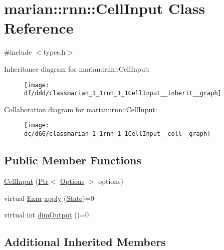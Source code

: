 \hypertarget{classmarian_1_1rnn_1_1CellInput}{}\section{marian\+:\+:rnn\+:\+:Cell\+Input Class Reference}
\label{classmarian_1_1rnn_1_1CellInput}


{\ttfamily \#include $<$types.\+h$>$}



Inheritance diagram for marian\+:\+:rnn\+:\+:Cell\+Input\+:
\nopagebreak
\begin{figure}[H]
\begin{center}
\leavevmode
\texttt{[image: df/ddd/classmarian\_1\_1rnn\_1\_1CellInput\_\_inherit\_\_graph]}
\end{center}
\end{figure}


Collaboration diagram for marian\+:\+:rnn\+:\+:Cell\+Input\+:
\nopagebreak
\begin{figure}[H]
\begin{center}
\leavevmode
\texttt{[image: dc/d66/classmarian\_1\_1rnn\_1\_1CellInput\_\_coll\_\_graph]}
\end{center}
\end{figure}
\subsection*{Public Member Functions}
\begin{DoxyCompactItemize}
\item 
\hyperlink{classmarian_1_1rnn_1_1CellInput_a05e62c038ab45237fcf5866a4e4ad75f}{Cell\+Input} (\hyperlink{namespacemarian_ad1a373be43a00ef9ce35666145137b08}{Ptr}$<$ \hyperlink{classmarian_1_1Options}{Options} $>$ options)
\item 
virtual \hyperlink{namespacemarian_a498d8baf75b754011078b890b39c8e12}{Expr} \hyperlink{classmarian_1_1rnn_1_1CellInput_afecfcb2679941468cf4dbab6dba4617e}{apply} (\hyperlink{structmarian_1_1rnn_1_1State}{State})=0
\item 
virtual int \hyperlink{classmarian_1_1rnn_1_1CellInput_a824402c4abc7e7197f32e7d5fcb7ce0c}{dim\+Output} ()=0
\end{DoxyCompactItemize}
\subsection*{Additional Inherited Members}


